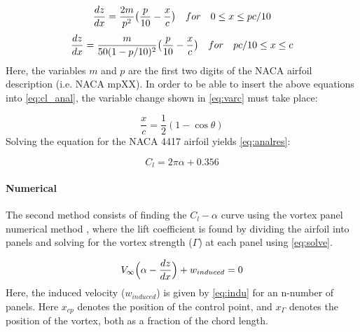 \begin{equation}
\label{eq:naca_geo1}
    \frac{dz}{dx} = \frac{2m}{p^{2}}\big{(}\frac{p}{10}-\frac{x}{c}\big{)} \quad for \quad 0 \leq x \leq pc/10
\end{equation}
\begin{equation}
\label{eq:naca_geo2}
    \frac{dz}{dx} = \frac{m}{50(1-p/10)^{2}}\big{(}\frac{p}{10}-\frac{x}{c}\big{)} \quad for \quad pc/10 \leq x \leq c
\end{equation}
Here, the variables $m$ and $p$ are the first two digits of the NACA airfoil description (i.e. NACA mpXX). In order to be able to insert the above equations into \autoref{eq:cl_anal}, the variable change shown in \autoref{eq:varc} must take place:

\begin{equation}
\label{eq:varc}
    \frac{x}{c} = \frac{1}{2}(1-\cos{\theta})
\end{equation}
Solving the equation for the NACA 4417 airfoil yields \autoref{eq:analres}:

\begin{equation}
\label{eq:analres}
    C_{l} = 2\pi\alpha + 0.356
\end{equation}


\paragraph{Numerical} The second method consists of finding the $C_{l}-\alpha$ curve using the vortex panel numerical method \cite[361]{anderson}, where the lift coefficient is found by dividing the airfoil into panels and solving for the vortex strength ($\Gamma$) at each panel using \autoref{eq:solve}.

\begin{equation}
\label{eq:solve}
    V_{\infty}\Big{(}\alpha - \frac{dz}{dx}\Big{)} + w_{induced} = 0
\end{equation}
Here, the induced velocity ($w_{induced}$) is given by \autoref{eq:indu} for an n-number of panels. Here $x_{cp}$ denotes the position of the control point, and $x_{\Gamma}$ denotes the position of the vortex, both as a fraction of the chord length.

